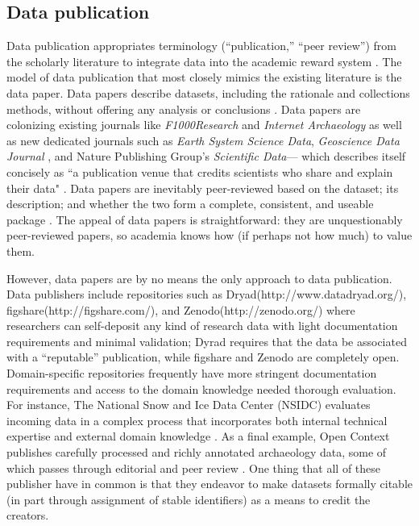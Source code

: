 \documentclass[10pt]{article}
\begin{document}
\subsection*{Data publication}
 
Data publication appropriates terminology (``publication,'' ``peer review'') from the scholarly literature to integrate data into the academic reward system \cite{costello_motivating_2009, lawrence_data_2011, atici_other_2012}.
The model of data publication that most closely mimics the existing literature is the data paper.
Data papers describe datasets, including the rationale and collections methods, without offering any analysis or conclusions \cite{newman_data_2009, callaghan_processes_2013}.
Data papers are colonizing existing journals like \emph{F1000Research} and \emph{Internet Archaeology} as well as new dedicated journals such as \emph{Earth System Science Data}, \emph{Geoscience Data Journal} \cite{allan_geoscience_2014}, and Nature Publishing Group's \emph{Scientific Data}--- which describes itself concisely as ``a publication venue that credits scientists who share and explain their data"  \cite{editors_more_2014}.
Data papers are inevitably peer-reviewed based on the dataset; its description; and whether the two form a complete, consistent, and useable package \cite{lawrence_data_2011}.
The appeal of data papers is straightforward: they are unquestionably peer-reviewed papers, so academia knows how (if perhaps not how much) to value them.

However, data papers are by no means the only approach to data publication.
Data publishers include repositories such as Dryad(http://www.datadryad.org/), figshare(http://figshare.com/), and Zenodo(http://zenodo.org/) where researchers can self-deposit any kind of research data with light documentation requirements and minimal validation; Dyrad requires that the data be associated with a ``reputable'' publication, while figshare and Zenodo are completely open.
Domain-specific repositories frequently have more stringent documentation requirements and access to the domain knowledge needed thorough evaluation.
For instance, The National Snow and Ice Data Center (NSIDC) evaluates incoming data in a complex process that incorporates both internal technical expertise and external domain knowledge \cite{weaver_data_2012}.
As a final example, Open Context publishes carefully processed and richly annotated archaeology data, some of which passes through editorial and peer review \cite{kansa_we_2013}.
One thing that all of these publisher have in common is that they endeavor to make datasets formally citable (in part through assignment of stable identifiers) as a means to credit the creators.
\end{document}
